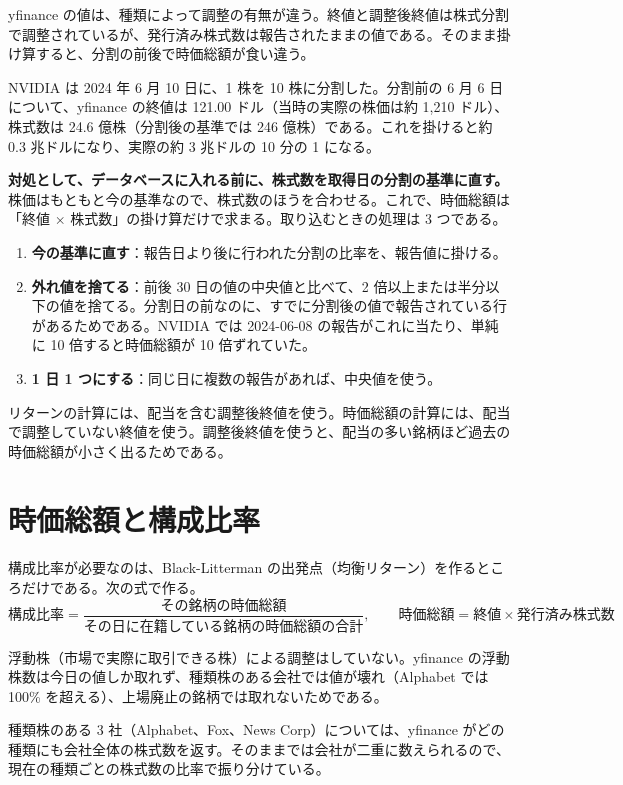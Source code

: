 \documentclass[xelatex,ja=standard,jafont=hiragino-pron,a4paper,10pt]{bxjsreport}
\begin{document}
yfinance の値は、種類によって調整の有無が違う。終値と調整後終値は株式分割で調整されているが、発行済み株式数は報告されたままの値である。そのまま掛け算すると、分割の前後で時価総額が食い違う。

NVIDIA は 2024 年 6 月 10 日に、1 株を 10 株に分割した。分割前の 6 月 6 日について、yfinance の終値は 121.00 ドル（当時の実際の株価は約 1,210 ドル）、株式数は 24.6 億株（分割後の基準では 246 億株）である。これを掛けると約 0.3 兆ドルになり、実際の約 3 兆ドルの 10 分の 1 になる。

\textbf{対処として、データベースに入れる前に、株式数を取得日の分割の基準に直す。}株価はもともと今の基準なので、株式数のほうを合わせる。これで、時価総額は「終値 $\times$ 株式数」の掛け算だけで求まる。取り込むときの処理は 3 つである。

\begin{enumerate}
\item \textbf{今の基準に直す}：報告日より後に行われた分割の比率を、報告値に掛ける。
\item \textbf{外れ値を捨てる}：前後 30 日の値の中央値と比べて、2 倍以上または半分以下の値を捨てる。分割日の前なのに、すでに分割後の値で報告されている行があるためである。NVIDIA では 2024-06-08 の報告がこれに当たり、単純に 10 倍すると時価総額が 10 倍ずれていた。
\item \textbf{1 日 1 つにする}：同じ日に複数の報告があれば、中央値を使う。
\end{enumerate}

リターンの計算には、配当を含む調整後終値を使う。時価総額の計算には、配当で調整していない終値を使う。調整後終値を使うと、配当の多い銘柄ほど過去の時価総額が小さく出るためである。

\section{時価総額と構成比率}

構成比率が必要なのは、Black-Litterman の出発点（均衡リターン）を作るところだけである。次の式で作る。
\[
\text{構成比率} = \frac{\text{その銘柄の時価総額}}{\text{その日に在籍している銘柄の時価総額の合計}},\qquad
\text{時価総額} = \text{終値} \times \text{発行済み株式数}
\]

浮動株（市場で実際に取引できる株）による調整はしていない。yfinance の浮動株数は今日の値しか取れず、種類株のある会社では値が壊れ（Alphabet では 100\% を超える）、上場廃止の銘柄では取れないためである。

種類株のある 3 社（Alphabet、Fox、News Corp）については、yfinance がどの種類にも会社全体の株式数を返す。そのままでは会社が二重に数えられるので、現在の種類ごとの株式数の比率で振り分けている。
\end{document}
